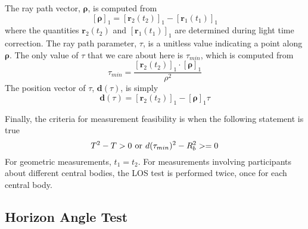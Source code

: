 {\begin{center}
\begin{minipage}[t]{5.0 in}
\begin{tabbing}[htbp!]
        \end{tabbing}
    \end{minipage}
\end{center}
%
The ray path vector, $\boldsymbol\rho$, is computed from
%
\begin{equation}
   \left[\boldsymbol{\rho}\right]_1 =  \left[ \mathbf{r}_2(t_2) \right]_1 -  \left[ \mathbf{r}_1 (t_1) \right]_1
\end{equation}
%
where the quantities $\mathbf{r}_2(t_2)$ and $\left[ \mathbf{r}_1 (t_1) \right]_1$ are determined during light time correction.
The ray path parameter, $\tau$, is a unitless value indicating a point along $\boldsymbol{\rho}$. The only value of $\tau$ that we care about here is $\tau_{min}$, which is computed from
%
\begin{equation}
     \tau_{min} = \frac{\left[ \mathbf{r}_2 (t_2) \right]_1 \cdot \left[\boldsymbol{\rho}\right]_1} {\rho^2}
\end{equation}
%
The position vector of $\tau$, $\mathbf{d}(\tau)$, is simply
%
\begin{equation}
    \mathbf{d}(\tau) = \left[ \mathbf{r}_2(t_2) \right]_1 -  \left[\boldsymbol{\rho}\right]_1 \tau
\end{equation}
%


Finally, the criteria for measurement feasibility is when the following statement is true
%
\begin{equation}
    T^2 - T > 0 \hspace{.05 in} \mbox{or} \hspace{.05 in} d(\tau_{min})^2 - R_b^2 >= 0
\end{equation}
%
For geometric measurements, $t_1 = t_2$.  For measurements involving participants about different central bodies, the LOS test is performed twice, once for each central body.

\subsection{Horizon Angle Test}

}
